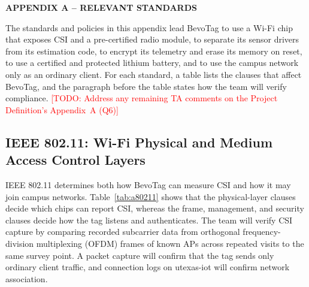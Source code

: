 \documentclass[12pt,letterpaper]{article}
\newcommand{\TODO}[1]{\textcolor{red}{[TODO: #1]}}
\begin{document}
\newcommand{\appendixdivider}[1]{%
  \clearpage\vspace*{0.20\textheight}\begin{center}\textbf{#1}\end{center}\clearpage}

\appendixdivider{APPENDIX A -- RELEVANT STANDARDS}
The standards and policies in this appendix lead BevoTag to use a Wi-Fi chip that exposes CSI
and a pre-certified radio module, to separate its sensor drivers from its estimation code, to
encrypt its telemetry and erase its memory on reset, to use a certified and protected lithium
battery, and to use the campus network only as an ordinary client. For each standard, a table lists
the clauses that affect BevoTag, and the paragraph before the table states how the team will verify
compliance. \TODO{Address any remaining TA comments on the Project Definition's Appendix~A (Q6)}

\subsection*{IEEE 802.11: Wi-Fi Physical and Medium Access Control Layers}
IEEE 802.11 \cite{std80211} determines both how BevoTag can measure CSI and how it may join campus
networks. Table~\ref{tab:a80211} shows that the physical-layer clauses decide which chips can report
CSI, whereas the frame, management, and security clauses decide how the tag listens and
authenticates. The team will verify CSI capture by comparing recorded subcarrier data from orthogonal
frequency-division multiplexing (OFDM) frames of known APs across repeated visits to the same survey
point. A packet capture will confirm that the tag sends only ordinary client traffic, and connection
logs on utexas-iot will confirm network association.
\end{document}
